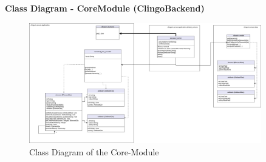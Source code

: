 \documentclass[12pt,a4paper]{article}
\newcommand{\<}[1]{\guilsinglleft}
\renewcommand{\>}[1]{\guilsinglright}
\begin{document}
\newpage

\noindent \textbf{Class Diagram - CoreModule (ClingoBackend)}

\begin{figure}[ht]
    \begin{center}
    \includegraphics[width=0.9\textwidth]{imgs/pt-v3-class-diag-core-module.png}
    \caption{Class Diagram of the Core-Module}
    \label{fig:pt-v3-class-diag-core-module}
    \end{center}
\end{figure}
\end{document}
